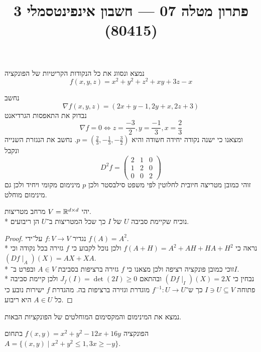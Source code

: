 
\title{פתרון מטלה 07 --- חשבון אינפינטסמלי 3 (80415)}


\maketitle
\maketitleprint{}

\Question{}
נמצא ונסווג את כל הנקודות הקריטיות של הפונקציה
\[
	f(x, y, z) = x^2 + y^2 + z^2 + xy + 3z - x
\]

נחשב
\[
	\nabla f(x, y, z) = (2x + y - 1, 2y + x, 2z + 3)
\]
נבדוק את התאפסות הגרדיאנט
\[
	\nabla f = 0 \iff z = \frac{-3}{2}, y = \frac{-1}{3}, x = \frac{2}{3}
\]
ומצאנו כי ישנה נקודה יחידה חשודה והיא $p = (\frac{2}{3}, -\frac{1}{3}, -\frac{3}{2})$.
נחשב את הנגזרת השנייה ונקבל
\[
	D^2f = \begin{pmatrix}
		2 & 1 & 0 \\
		1 & 2 & 0 \\
		0 & 0 & 2
	\end{pmatrix}
\]
זוהי כמובן מטריצה חיובית לחלוטין לפי משפט סילבסטר ולכן $p$ מינימום מקומי ויחיד ולכן גם מינימום מוחלט.

\Question{}
יהי $V = \mathbb{R}^{d \times d}$ מרחב מטריצות. \\*
נוכיח שקיימת סביבה $U$ של $I$ כך שכל המטריצות ב־$U$ הן ריבועים.
\begin{proof}
	נגדיר $f : V \to V$ על־ידי $f(A) = A^2$. \\*
	נראה כי $f(A + H) = A^2 + A H + H A + H^2$ ולכן נוכל לקבוע כי $f$ גזירה בכל נקודה וכי $(D f \mid_A)(X) = AX + XA$. \\*
	זוכי כמובן פונקציה רציפה ולכן מצאנו כי $f$ גזירה ברציפות בסביבת $A \in V$ ובפרט ב־$I$. \\*
	נבחין כי $(Df\mid_I)(X) = 2X$ ובהתאם $J_f(I) = \det(2I) \ge 0$ ולכן קיימת סביבה פתוחה $I \ni U \subseteq V$ כך ש־$f^{-1} : U \to U$ מוגדרת וגזירה ברציפות בה.
	מהגדרת $f$ ישירות נובע כי כל $A \in U$ היא ריבוע.
\end{proof}

\Question{}
נמצא את המינימום והמקסימום המוחלטים של הפונקציות הבאות.

\Subquestion{}
הפונקציה $f(x, y) = x^2 + y^2 - 12x + 16y$ בתחום $A = \{(x, y) \mid x^2 + y^2 \le 1, 3x \ge -y \}$.


